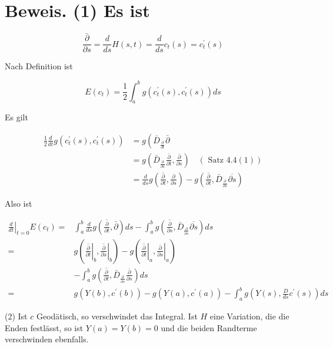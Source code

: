 \documentclass[10pt]{article}
\begin{document}
\section*{Beweis. (1) Es ist}
$$
\frac{\bar{\partial}}{\partial s}=\frac{d}{d s} H(s, t)=\frac{d}{d s} c_{t}(s)=c_{t}^{\prime}(s)
$$

Nach Definition ist

$$
E\left(c_{t}\right)=\frac{1}{2} \int_{a}^{b} g\left(c_{t}^{\prime}(s), c_{t}^{\prime}(s)\right) d s
$$

Es gilt


\begin{align*}
\frac{1}{2} \frac{d}{d t} g\left(c_{t}^{\prime}(s), c_{t}^{\prime}(s)\right) & =g\left(\bar{D}_{\frac{\partial}{\partial t}} \bar{\partial}\right.  \tag{2}\\
& =g\left(\bar{D}_{\frac{\partial}{\partial s}} \frac{\bar{\partial}}{\partial t}, \frac{\bar{\partial}}{\partial s}\right) \quad(\text { Satz } 4.4(1))  \tag{1}\\
& =\frac{d}{d s} g\left(\overline{\frac{\partial}{\partial t}}, \frac{\partial}{\partial s}\right)-g\left(\overline{\frac{\partial}{\partial t}}, \bar{D}_{\frac{\partial}{\partial s}} \overline{\partial s}\right) \tag{2}
\end{align*}


Also ist

$$
\begin{aligned}
\left.\frac{d}{d t}\right|_{t=0} E\left(c_{t}\right)= & \int_{a}^{b} \frac{d}{d s} g\left(\overline{\frac{\partial}{\partial t}}, \bar{\partial}\right) d s-\int_{a}^{b} g\left(\overline{\frac{\partial}{\partial s}}, \bar{D}_{\frac{\partial}{\partial s}} \overline{\partial s}\right) d s \\
= & g\left(\left.\overline{\frac{\partial}{\partial t}}\right|_{b},\left.\overline{\frac{\partial}{\partial s}}\right|_{b}\right)-g\left(\left.\overline{\frac{\partial}{\partial t}}\right|_{a},\left.\frac{\bar{\partial}}{\partial s}\right|_{a}\right) \\
& -\int_{a}^{b} g\left(\overline{\frac{\partial}{\partial t}}, \bar{D}_{\frac{\partial}{\partial s}} \frac{\bar{\partial}}{\partial s}\right) d s \\
= & g\left(Y(b), c^{\prime}(b)\right)-g\left(Y(a), c^{\prime}(a)\right)-\int_{a}^{b} g\left(Y(s), \frac{D}{d s} c^{\prime}(s)\right) d s
\end{aligned}
$$

(2) Ist $c$ Geodätisch, so verschwindet das Integral. Ist $H$ eine Variation, die die Enden festlässt, so ist $Y(a)=Y(b)=0$ und die beiden Randterme verschwinden ebenfalls.
\end{document}
